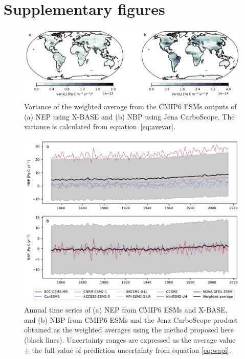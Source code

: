 \documentclass[gmd, manuscript]{copernicus}
\begin{document}



\clearpage

\appendix
\section{Supplementary figures}    %

\begin{figure}[htbp]
   \centering
   \includegraphics[width=14cm]{Figures/Var.pdf} %
   \caption{Variance of the weighted average from the CMIP6 ESMs outputs of (a) NEP using X-BASE and (b) NBP using Jena CarboScope.
The variance is calculated from equation~\eqref{eq:avevar}.}
   \label{fig:variance_average}
\end{figure}


\begin{figure}[htbp]
   \centering
   \includegraphics[width=14cm]{Figures/Time_series_NXP_vf.pdf} %
   \caption{Annual time series of  (a) NEP from CMIP6 ESMs and X-BASE, and (b) NBP from CMIP6 ESMs and the Jena CarboScope product obtained as the weighted averages using the method proposed here (black lines). Uncertainty ranges are expressed as the average value $\pm$ the full value of prediction uncertainty from equation \eqref{eq:wapi}.}
   \label{fig:averagesFullUncertainty}
\end{figure}
\end{document}
